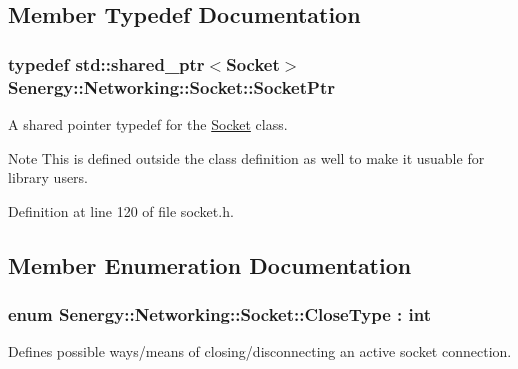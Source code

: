 \subsection{Member Typedef Documentation}
\hypertarget{class_senergy_1_1_networking_1_1_socket_a19cb724ef153aebdbcc66cd4c3c4952a}{
\subsubsection[{Socket\-Ptr}]{\setlength{\rightskip}{0pt plus 5cm}typedef std\-::shared\-\_\-ptr$<${\bf Socket}$>$ {\bf Senergy\-::\-Networking\-::\-Socket\-::\-Socket\-Ptr}}}\label{class_senergy_1_1_networking_1_1_socket_a19cb724ef153aebdbcc66cd4c3c4952a}


A shared pointer typedef for the \hyperlink{class_senergy_1_1_networking_1_1_socket}{Socket} class. 

\begin{DoxyNote}{Note}
This is defined outside the class definition as well to make it usuable for library users. 
\end{DoxyNote}


Definition at line 120 of file socket.\-h.



\subsection{Member Enumeration Documentation}
\hypertarget{class_senergy_1_1_networking_1_1_socket_a9a69a0d516b18e2a3bec77dc032b9993}{
\subsubsection[{Close\-Type}]{\setlength{\rightskip}{0pt plus 5cm}enum {\bf Senergy\-::\-Networking\-::\-Socket\-::\-Close\-Type} \-: int\hspace{0.3cm}{\ttfamily [strong]}}}\label{class_senergy_1_1_networking_1_1_socket_a9a69a0d516b18e2a3bec77dc032b9993}


Defines possible ways/means of closing/disconnecting an active socket connection. 

